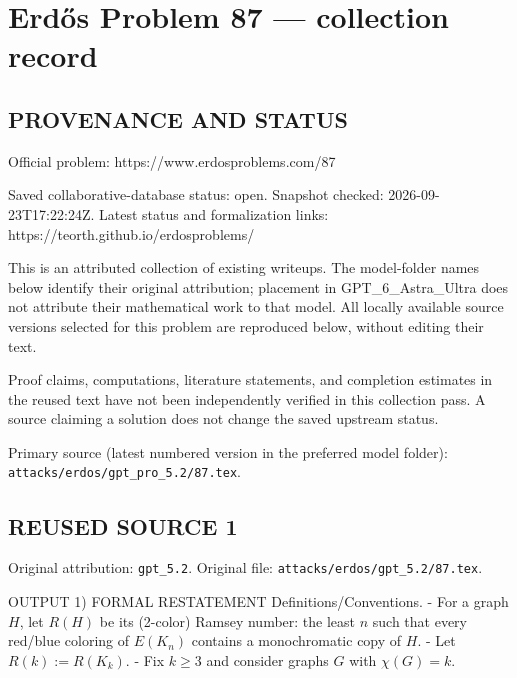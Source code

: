 \section*{Erd\H{o}s Problem 87 --- collection record}

\subsection*{PROVENANCE AND STATUS}
Official problem: https://www.erdosproblems.com/87

Saved collaborative-database status: open.
Snapshot checked: 2026-09-23T17:22:24Z.
Latest status and formalization links: https://teorth.github.io/erdosproblems/

This is an attributed collection of existing writeups. The model-folder names below identify their original attribution; placement in GPT\_6\_Astra\_Ultra does not attribute their mathematical work to that model. All locally available source versions selected for this problem are reproduced below, without editing their text.

Proof claims, computations, literature statements, and completion estimates in the reused text have not been independently verified in this collection pass. A source claiming a solution does not change the saved upstream status.

Primary source (latest numbered version in the preferred model folder): \texttt{attacks/erdos/gpt\_pro\_5.2/87.tex}.

\subsection*{REUSED SOURCE 1}
Original attribution: \texttt{gpt\_5.2}.
Original file: \texttt{attacks/erdos/gpt\_5.2/87.tex}.


OUTPUT
1) FORMAL RESTATEMENT
Definitions/Conventions.
- For a graph $H$, let $R(H)$ be its (2-color) Ramsey number: the least $n$ such that every red/blue coloring of $E(K_n)$ contains a monochromatic copy of $H$.
- Let $R(k):=R(K_k)$.
- Fix $k\ge 3$ and consider graphs $G$ with $\chi(G)=k$.

